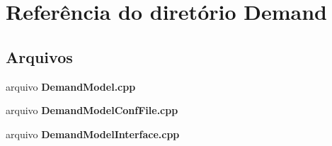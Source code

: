 \section{Referência do diretório Demand}
\label{dir_d0d4e5c0f1bd0cc7e0db7d827629f91d}
\subsection*{Arquivos}
\begin{DoxyCompactItemize}
\item 
arquivo {\bf Demand\+Model.\+cpp}
\item 
arquivo {\bf Demand\+Model\+Conf\+File.\+cpp}
\item 
arquivo {\bf Demand\+Model\+Interface.\+cpp}
\end{DoxyCompactItemize}
